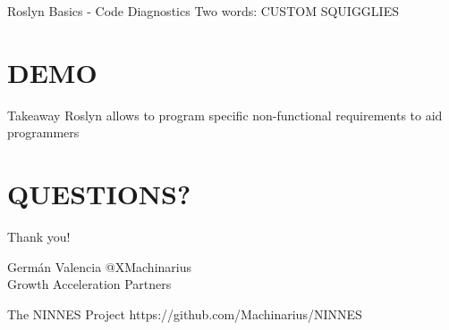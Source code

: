 \documentclass[10pt]{beamer}
\begin{document}
\begin{frame}{Roslyn Basics - Code Diagnostics}
Two words: CUSTOM SQUIGGLIES
\end{frame}

\section{DEMO}

\begin{frame}{Takeaway}
    Roslyn allows to program specific non-functional requirements to aid programmers
\end{frame}

\section{QUESTIONS?}

\begin{frame}{Thank you!}
\begin{block}{Germán Valencia}
    @XMachinarius \\ 
    Growth Acceleration Partners
\end{block}

\begin{block}{The NINNES Project}
    https://github.com/Machinarius/NINNES
\end{block}
\end{frame}

{ %
    \begin{frame}[plain]
     \end{frame}
}
\end{document}
